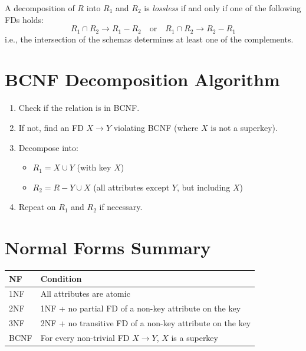 \begin{theorem}
A decomposition of $R$ into $R_1$ and $R_2$ is \emph{lossless} if and only
if one of the following FDs holds:
\[
R_1 \cap R_2 \to R_1 - R_2 \quad \text{or} \quad R_1 \cap R_2 \to R_2 - R_1
\]
i.e., the intersection of the schemas determines at least one of the complements.
\end{theorem}

\section{BCNF Decomposition Algorithm}

\begin{proposition}
\begin{enumerate}
    \item Check if the relation is in BCNF.
    \item If not, find an FD $X \to Y$ violating BCNF (where $X$ is not a superkey).
    \item Decompose into:
          \begin{itemize}
              \item $R_1 = X \cup Y$ (with key $X$)
              \item $R_2 = R - Y \cup X$ (all attributes except $Y$, but including $X$)
          \end{itemize}
    \item Repeat on $R_1$ and $R_2$ if necessary.
\end{enumerate}
\end{proposition}

\section{Normal Forms Summary}

\begin{keyformulas}[title=\textbf{Normal Forms Overview}]
\begin{center}
\begin{tabular}{lp{10cm}}
\toprule
\textbf{NF} & \textbf{Condition} \\
\midrule
1NF & All attributes are atomic \\
2NF & 1NF + no partial FD of a non-key attribute on the key \\
3NF & 2NF + no transitive FD of a non-key attribute on the key \\
BCNF & For every non-trivial FD $X \to Y$, $X$ is a superkey \\
\bottomrule
\end{tabular}
\end{center}
\end{keyformulas}

